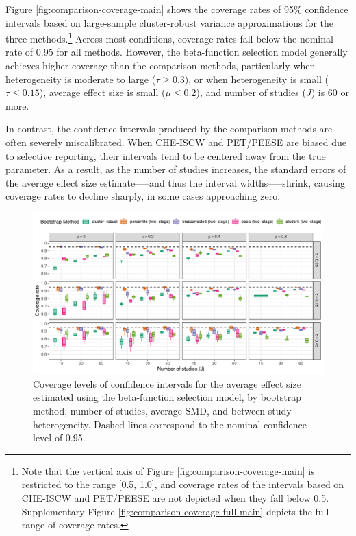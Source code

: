 \documentclass[
  american,
  man, donotrepeattitle,floatsintext]{apa7}
\begin{document}
Figure \ref{fig:comparison-coverage-main} shows the coverage rates of 95\% confidence intervals based on large-sample cluster-robust variance approximations for the three methods.\footnote{Note that the vertical axis of Figure \ref{fig:comparison-coverage-main} is restricted to the range {[}0.5, 1.0{]}, and coverage rates of the intervals based on CHE-ISCW and PET/PEESE are not depicted when they fall below 0.5. Supplementary Figure \ref{fig:comparison-coverage-full-main} depicts the full range of coverage rates.}
Across most conditions, coverage rates fall below the nominal rate of 0.95 for all methods. However, the beta-function selection model generally achieves higher coverage than the comparison methods, particularly when heterogeneity is moderate to large (\(\tau \geq 0.3\)), or when heterogeneity is small (\(\tau \leq 0.15\)), average effect size is small (\(\mu \leq 0.2\)), and number of studies (\(J\)) is 60 or more.

In contrast, the confidence intervals produced by the comparison methods are often severely miscalibrated. When CHE-ISCW and PET/PEESE are biased due to selective reporting, their intervals tend to be centered away from the true parameter. As a result, as the number of studies increases, the standard errors of the average effect size estimate-----and thus the interval widths-----shrink, causing coverage rates to decline sharply, in some cases approaching zero.

\begin{figure}
\includegraphics{beta-function-selection-models-with-dependent-effects_files/figure-latex/Beta-coverage-main-1} \caption{Coverage levels of confidence intervals for the average effect size estimated using the beta-function selection model, by bootstrap method, number of studies, average SMD, and between-study heterogeneity. Dashed lines correspond to the nominal confidence level of 0.95.}\label{fig:Beta-coverage-main}
\end{figure}
\end{document}
